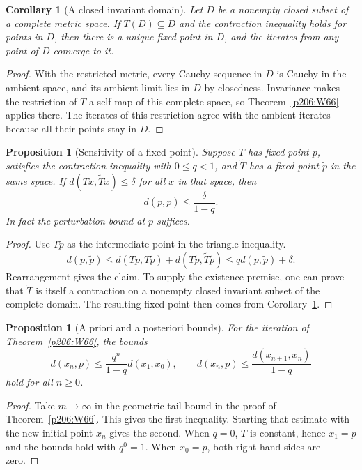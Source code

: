 \documentclass[11pt,oneside,openany]{book}
\theoremstyle{plain}
\newtheorem{proposition}[theorem]{Proposition}
\newtheorem{corollary}[theorem]{Corollary}
\theoremstyle{definition}
\theoremstyle{remark}
\begin{document}
\begin{corollary}[A closed invariant domain]\label{p206:W67}
Let \(D\) be a nonempty closed subset of a complete metric space.
If \(T(D)\subseteq D\) and the contraction inequality holds for
points in \(D\), then there is a unique fixed point in \(D\), and the
iterates from any point of \(D\) converge to it.
\end{corollary}
\begin{proof}
With the restricted metric, every Cauchy sequence in \(D\) is Cauchy
in the ambient space, and its ambient limit lies in \(D\) by closedness.
Invariance makes the restriction of \(T\) a self-map of this complete
space, so Theorem~\ref{p206:W66} applies there. The iterates of this
restriction agree with the ambient iterates because all their points
stay in \(D\).
\end{proof}

\begin{proposition}[Sensitivity of a fixed point]\label{p206:W68}
Suppose \(T\) has fixed point \(p\), satisfies the contraction
inequality with \(0\le q<1\), and \(\widetilde T\) has a fixed point
\(\tilde p\) in the same space. If
\(d(Tx,\widetilde T x)\le\delta\) for all \(x\) in that space, then
\[
 d(p,\tilde p)\le\frac{\delta}{1-q}.
\]
In fact the perturbation bound at \(\tilde p\) suffices.
\end{proposition}
\begin{proof}
Use \(T\tilde p\) as the intermediate point in the triangle
inequality.
\[
 d(p,\tilde p)
 \le d(Tp,T\tilde p)+d(T\tilde p,\widetilde T\tilde p)
 \le qd(p,\tilde p)+\delta.
\]
Rearrangement gives the claim. To supply the existence premise,
one can prove that \(\widetilde T\) is itself a contraction on a
nonempty closed invariant subset of the complete domain. The resulting
fixed point then comes from Corollary~\ref{p206:W67}.
\end{proof}

\begin{proposition}[A priori and a posteriori bounds]\label{p206:W69}
For the iteration of Theorem~\ref{p206:W66}, the bounds
\[
 d(x_n,p)\le\frac{q^n}{1-q}d(x_1,x_0),\qquad
 d(x_n,p)\le\frac{d(x_{n+1},x_n)}{1-q}
\]
hold for all \(n\ge0\).
\end{proposition}
\begin{proof}
Take \(m\to\infty\) in the geometric-tail bound in the proof of
Theorem~\ref{p206:W66}. This gives the first inequality.
Starting that estimate with the new initial point \(x_n\) gives the
second. When \(q=0\), \(T\) is constant, hence \(x_1=p\) and the bounds
hold with \(q^0=1\). When \(x_0=p\), both right-hand sides are zero.
\end{proof}
\end{document}
